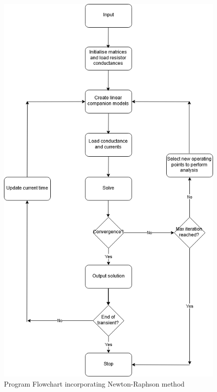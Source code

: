 \documentclass[12pt,a4paper]{article}
\begin{document}
\begin{figure}
	\centering
	\includegraphics[scale=0.5]{Newton_Raphson.png}
	\caption{Program Flowchart incorporating Newton-Raphson method}
\end{figure}

\pagebreak
\end{document}
